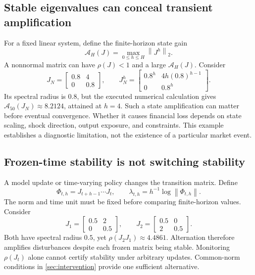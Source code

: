 \documentclass[11pt,a4paper]{article}
\theoremstyle{definition}
\theoremstyle{remark}
\newcommand{\norm}[1]{\left\lVert #1\right\rVert}
\begin{document}
\subsection{Stable eigenvalues can conceal transient amplification}
For a fixed linear system, define the finite-horizon state gain
\begin{equation}
 \mathcal A_H(J)=\max_{0\leq h\leq H}\norm{J^h}_2.
 \label{eq:gain}
\end{equation}
A nonnormal matrix can have $\rho(J)<1$ and a large $\mathcal A_H(J)$. Consider
\begin{equation}
 J_N=\begin{bmatrix}0.8&4\\0&0.8\end{bmatrix},\qquad
 J_N^h=\begin{bmatrix}0.8^h&4h(0.8)^{h-1}\\0&0.8^h\end{bmatrix}.
 \label{eq:nonnormal}
\end{equation}
Its spectral radius is $0.8$, but the executed numerical calculation gives $\mathcal A_{50}(J_N)\approx8.2124$, attained at $h=4$. Such a state amplification can matter before eventual convergence. Whether it causes financial loss depends on state scaling, shock direction, output exposure, and constraints. This example establishes a diagnostic limitation, not the existence of a particular market event.

\subsection{Frozen-time stability is not switching stability}
A model update or time-varying policy changes the transition matrix. Define
\begin{equation}
 \Phi_{t,h}=J_{t+h-1}\cdots J_t,\qquad
 \lambda_{t,h}=h^{-1}\log\norm{\Phi_{t,h}}.
 \label{eq:product}
\end{equation}
The norm and time unit must be fixed before comparing finite-horizon values. Consider
\begin{equation}
 J_1=\begin{bmatrix}0.5&2\\0&0.5\end{bmatrix},\qquad
 J_2=\begin{bmatrix}0.5&0\\2&0.5\end{bmatrix}.
 \label{eq:switch}
\end{equation}
Both have spectral radius $0.5$, yet $\rho(J_2J_1)\approx4.4861$. Alternation therefore amplifies disturbances despite each frozen matrix being stable. Monitoring $\rho(J_t)$ alone cannot certify stability under arbitrary updates. Common-norm conditions in \cref{sec:intervention} provide one sufficient alternative.
\end{document}
